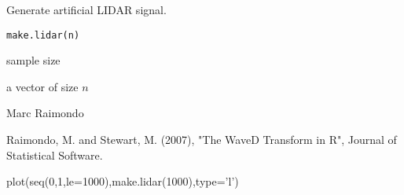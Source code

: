 \documentclass{article}
\begin{document}
\begin{Description}\relax
Generate artificial LIDAR signal.
\end{Description}
\begin{Usage}
\begin{verbatim}
make.lidar(n)
\end{verbatim}
\end{Usage}
\begin{Arguments}
\begin{ldescription}
\item[\code{n}] sample size
\end{ldescription}
\end{Arguments}
\begin{Value}
a vector of size $n$
\end{Value}
\begin{Author}\relax
Marc Raimondo
\end{Author}
\begin{References}\relax
Raimondo, M. and Stewart, M. (2007),
"The WaveD Transform in R", Journal of Statistical Software.
\end{References}
\begin{SeeAlso}\relax
{}
\end{SeeAlso}
\begin{Examples}
\begin{ExampleCode}
plot(seq(0,1,le=1000),make.lidar(1000),type='l')
\end{ExampleCode}
\end{Examples}
\end{document}
